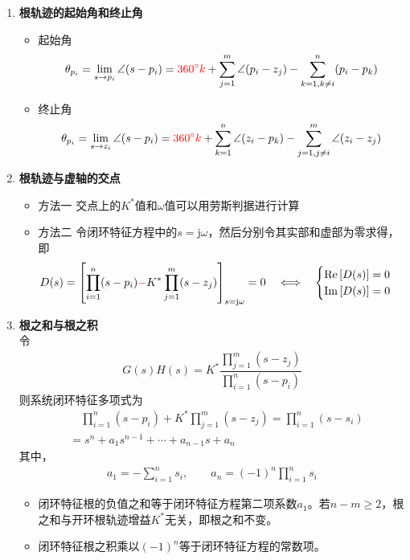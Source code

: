 \begin{enumerate}
	\item \textbf{根轨迹的起始角和终止角}
	\begin{itemize}
		\item 起始角
		\begin{align}
			\theta_{p_i} = \lim\limits_{s \to p_i} \angle (s - p_i) =  \textcolor{red}{360 {}^{\circ} k}  + \sum_{j = 1}^{m}\angle (p_i - z_j) - \sum_{k = 1, k \neq i }^{n} (p_i - p_k) 
		\end{align}
		\item 终止角
		\begin{align}
			\theta_{p_i} = \lim\limits_{s \to z_i} \angle (s - p_i) =  \textcolor{red}{360 {}^{\circ} k} + \sum_{k = 1}^{n} \angle(z_i - p_k) - \sum_{j = 1, j \neq i}^{m}\angle (z_i - z_j)
		\end{align}
	\end{itemize}
	
	
	\item \textbf{根轨迹与虚轴的交点}
	\vspace*{-1em}
	\begin{itemize}
		\item 方法一 \quad 交点上的$K^*$值和$\omega$值可以用劳斯判据进行计算
		\item 方法二 \quad 令闭环特征方程中的$s = \text{j}\omega$，然后分别令其实部和虚部为零求得，即
		\begin{align}
			D(s) = \left[\prod_{i = 1}^n (s - p_i) \textcolor{red}{-} K^* \prod_{j = 1}^{m}(s - z_j) \right]_{s=\text{j}\omega} = 0 \quad \Longleftrightarrow \quad 
			\begin{cases}
				\text{Re}\left[D(s)\right] = 0\\
				\text{Im}\left[D(s)\right] = 0
			\end{cases}
		\end{align}
	\end{itemize}
	
	
	\item \textbf{根之和与根之积}\\
	令
	\begin{align*}
		G(s)H(s) = K^* \dfrac{\displaystyle \prod_{j = 1}^m (s - z_j)}{\displaystyle \prod_{i = 1}^n (s - p_i)}
	\end{align*}
	则系统闭环特征多项式为
	\begin{align*}
		&\quad \prod_{i = 1}^n (s - p_i) + K^*\prod_{j = 1}^m (s - z_j) = \prod_{i = 1}^n(s - s_i)\\
		& = s^n + a_1 s^{n-1} + \cdots + a_{n-1}s + a_n
	\end{align*}
	其中，
	\begin{align}
		a_1 = - \sum_{i = 1}^n s_i, \quad \quad a_n = (-1)^n \prod_{i=1}^{n} s_i 
	\end{align}
	\begin{itemize}
		\item 闭环特征根的负值之和等于闭环特征方程第二项系数$a_1$。若$n - m \ge 2$，根之和与开环根轨迹增益$K^*$无关，即根之和不变。
		\item 闭环特征根之积乘以$(-1)^n$等于闭环特征方程的常数项。	
	\end{itemize}
	
\end{enumerate}
